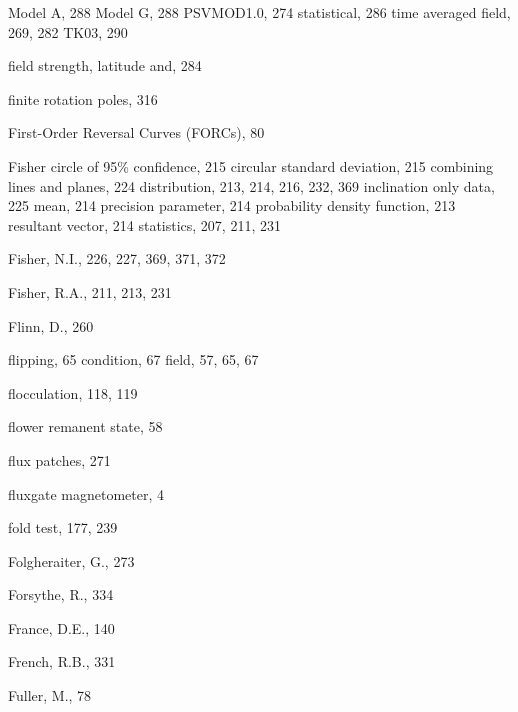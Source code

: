 \documentclass[,plain]{tauxe}
\begin{document}
\begin{theindex}
    \subitem Model A, 288
    \subitem Model G, 288
    \subitem PSVMOD1.0, 274
    \subitem statistical, 286
    \subitem time averaged field, 269, 282
    \subitem TK03, 290
  \item field strength, latitude and, 284
  \item finite rotation poles, 316
  \item First-Order Reversal Curves (FORCs), 80
  \item Fisher
    \subitem circle of 95\% confidence, 215
    \subitem circular standard deviation, 215
    \subitem combining lines and planes, 224
    \subitem distribution, 213, 214, 216, 232, 369
    \subitem inclination only data, 225
    \subitem mean, 214
    \subitem precision parameter, 214
    \subitem probability density function, 213
    \subitem resultant vector, 214
    \subitem statistics, 207, 211, 231
  \item Fisher, N.I., 226, 227, 369, 371, 372
  \item Fisher, R.A., 211, 213, 231
  \item Flinn, D., 260
  \item flipping, 65
    \subitem condition, 67
    \subitem field, 57, 65, 67
  \item flocculation, 118, 119
  \item flower remanent state, 58
  \item flux patches, 271
  \item fluxgate magnetometer, 4
  \item fold test, 177, 239
  \item Folgheraiter, G., 273
  \item Forsythe, R., 334
  \item France, D.E., 140
  \item French, R.B., 331
  \item Fuller, M., 78

  \indexspace


\end{theindex}
\end{document}
